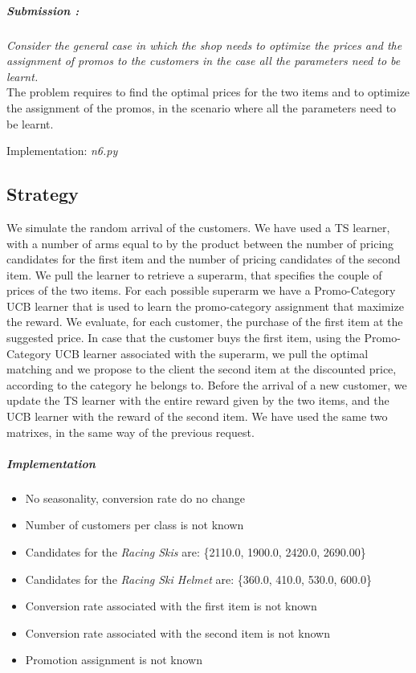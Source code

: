 \subparagraph*{Submission : }
\textit{Consider the general case in which the shop needs to optimize the prices and the assignment of promos to the customers in the case all the parameters need to be learnt.}\\

The problem requires to find the optimal prices for the two items and to optimize the assignment of the promos, in the scenario where all the parameters need to be learnt.

Implementation: \textit{n6.py}
\subsection*{Strategy}
We simulate the random arrival of the customers. We have used a TS learner, with a number of arms equal to by the product between the number of pricing candidates for the first item and the number of pricing candidates of the second item. We pull the learner to retrieve a superarm, that specifies the couple of prices of the two items. For each possible superarm we have a Promo-Category UCB learner that is used to learn the promo-category assignment that maximize the reward.  We evaluate, for each customer, the purchase of the first item at the suggested price. In case that the customer buys the first item, using the Promo-Category UCB learner associated with the superarm, we pull the optimal matching and we propose to the client the second item at the discounted price, according to the category he belongs to. Before the arrival of a new customer, we update the TS learner with the entire reward given by the two items, and the UCB learner with the reward of the second item. We have used the same two matrixes, in the same way of the previous request.

\subparagraph{Implementation} 
\begin{itemize}
	\item No seasonality, conversion rate do no change
	\item Number of customers per class is not known 
	\item Candidates for the \textit{Racing Skis} are: \{2110.0, 1900.0, 2420.0, 2690.00\}
	\item Candidates for the \textit{Racing Ski Helmet} are: \{360.0, 410.0, 530.0, 600.0\}
	\item Conversion rate associated with the first item is not known
	\item Conversion rate associated with the second item is not known
	\item Promotion assignment is not known 
\end{itemize}


